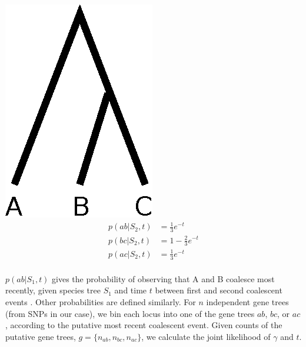 \documentclass[11pt,a4paper]{report}
\begin{document}
	\begin{minipage}[b]{0.3\linewidth}
		\centering
		\includegraphics[width=0.66\linewidth]{Hybrid_tree_bc.eps}
		\begin{align*}
p(ab|S_2, t) &= \frac{1}{3}e^{-t}\\
p(bc|S_2, t) &= 1 - \frac{2}{3}e^{-t}\\
p(ac|S_2, t) &= \frac{1}{3}e^{-t}\\
\end{align*}

	\end{minipage}


$p(ab|S_1, t)$ gives the probability of observing that A and B coalesce most recently,
given species tree $S_1$ and time $t$ between first and second coalescent
events \citep{meng_detecting_2009}.
Other probabilities are defined similarly.
For $n$ independent gene trees (from SNPs in our case),
we bin each locus into one of the gene trees $ab$, $bc$, or $ac$,
according to the putative most recent coalescent event.
Given counts of the putative gene trees, $g = \{n_{ab},n_{bc},n_{ac}\}$, we
calculate the joint likelihood of $\gamma$ and $t$.
\end{document}
